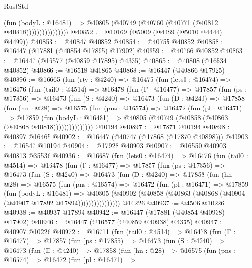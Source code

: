 \begin{lexlean}{RustStd}
\begin{coremodule}
                          (fun (bodyL : @16481) =>
                          @40805 (@40749 (@40760 (@40771 (@40812 @40818))))))))))))))))
@40852 := @10169 (@5009 (@4489 (@5010 @4444) @4499))
@40853 := @40847 @40852
@40854 := @40755 @40852
@40858 := @16447 (@17881 (@40854 @17895) @17902)
@40859 := @40766 @40852
@40863 := @16447 (@16577 (@40859 @17895) @4335)
@40865 := @40808 (@16534 @40852)
@40866 := @16518 @40865
@40868 := @16447 (@40866 @17925)
@40896 := @16665
    (fun (rty : @4240) =>
    @16475
      (fun (lets0 : @16474) =>
      @16476
        (fun (tail0 : @4514) =>
        @16478
          (fun (Γ : @16477) =>
          @17857
            (fun (ps : @17856) =>
            @16473
              (fun (S : @4240) =>
              @16473
                (fun (D : @4240) =>
                @17858
                  (fun (hn : @28) =>
                  @16575
                    (fun (pns : @16574) =>
                    @16472
                      (fun (pl : @16471) =>
                      @17859
                        (fun (bodyL : @16481) =>
                        @40805 (@40749 (@40858 (@40863 (@40868 @40818)))))))))))))))
    @10194
@40897 := @17871 @10194
@40898 := @40897 @16465
@40902 := @16447 (@40747 (@17868 (@17870 @40898)))
@40903 := @16547 @10194
@40904 := @17928 @40903
@40907 := @16550 @40903 @40813 @35536
@40936 := @16687
    (fun (lets0 : @16474) =>
    @16476
      (fun (tail0 : @4514) =>
      @16478
        (fun (Γ : @16477) =>
        @17857
          (fun (ps : @17856) =>
          @16473
            (fun (S : @4240) =>
            @16473
              (fun (D : @4240) =>
              @17858
                (fun (hn : @28) =>
                @16575
                  (fun (pns : @16574) =>
                  @16472
                    (fun (pl : @16471) =>
                    @17859
                      (fun (bodyL : @16481) =>
                      @40805
                        (@40902
                          (@40858 (@40863 (@40868 (@40904 (@40907 @17892 @17894))))))))))))))))
    @10226
@40937 := @4506 @10226
@40938 := @40937 @17894
@40942 := @16447 (@17881 (@40854 @40938) @17902)
@40946 := @16447 (@16577 (@40859 @40938) @4335)
@40947 := @40907 @10226
@40972 := @16711
    (fun (tail0 : @4514) =>
    @16478
      (fun (Γ : @16477) =>
      @17857
        (fun (ps : @17856) =>
        @16473
          (fun (S : @4240) =>
          @16473
            (fun (D : @4240) =>
            @17858
              (fun (hn : @28) =>
              @16575
                (fun (pns : @16574) =>
                @16472
                  (fun (pl : @16471) =>

\end{coremodule}
\end{lexlean}
